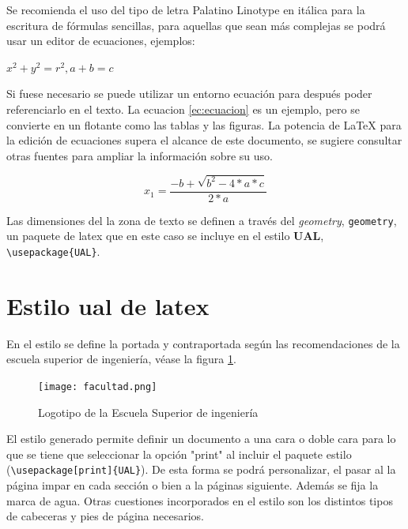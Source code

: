 Se recomienda el uso del tipo de letra Palatino Linotype en itálica para la escritura de fórmulas sencillas, para aquellas que sean más complejas se podrá usar un editor de ecuaciones, ejemplos:

$ x^2+y^2=r^2,    a+b=c$

Si fuese necesario se puede utilizar un entorno ecuación para después poder referenciarlo en el texto. La ecuacion  \ref{ec:ecuacion} es un ejemplo, pero se convierte en un flotante como las tablas y las figuras. La potencia de \LaTeX{} para la edición de ecuaciones supera el alcance de este documento, se sugiere consultar otras fuentes para ampliar la información sobre su uso.

\begin{equation}
\label{ec:ecuacion}
    x_1= \frac{-b+\sqrt{b^2-4*a*c}}{2*a}
\end{equation}




Las dimensiones del la zona de texto se definen a través del \emph{geometry}, \lstinline[language=enparrafo]!geometry!, un paquete de latex que en este caso se incluye en el estilo \textbf{UAL}, \lstinline[language=enparrafo]!\usepackage{UAL}!.

\section {Estilo ual de latex}

En el estilo se define la portada y contraportada según las recomendaciones de la escuela superior de ingeniería, véase la figura \ref{fig:facultad}.

\begin{figure}
	\begin{center}
		\texttt{[image: facultad.png]}
	\end{center}
	\caption{\label{fig:facultad} Logotipo de la Escuela Superior de ingeniería }
\end{figure}



El estilo generado permite definir un documento a una cara o doble cara para lo que se tiene que seleccionar la opción "print" al incluir el paquete estilo (\lstinline[language=enparrafo]!\usepackage[print]{UAL}!). De esta forma se podrá personalizar, el pasar al la página impar en cada sección o bien a la páginas siguiente. %
Además se fija la marca de agua. Otras cuestiones incorporados en el estilo son los distintos tipos de cabeceras y pies de página necesarios.

